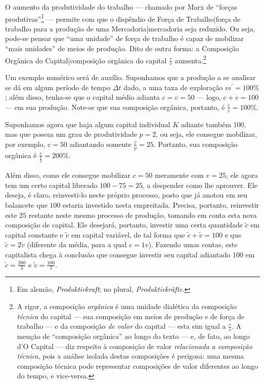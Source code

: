 O aumento da produtividade do trabalho — chamado por Marx de ``forças produtivas''\footnote{Em alemão, \textit{Produktivkraft}; no plural, \textit{Produktivkräfte}.} — permite com que o dispêndio de Força de Trabalho|força de trabalho para a produção de uma Mercadoria|mercadoria seja reduzido. Ou seja, pode-se pensar que ``uma unidade'' de força de trabalho é capaz de mobilizar ``mais unidades'' de meios de produção. Dito de outra forma: a Composição Orgânica do Capital|composição orgânica do capital $\frac{c}{v}$ aumenta.\footnote{A rigor, a composição \textit{orgânica} é uma unidade dialética da composição \textit{técnica} do capital — sua composição em meios de produção e de força de trabalho — e da composição \textit{de valor} do capital — esta sim igual a $\frac{c}{v}$. A menção de ``composição orgânica'' ao longo do texto — e, de fato, ao longo d'O Capital — diz respeito à composição de valor \textit{relacionada a composição técnica}, pois a análise isolada destas composições é perigosa: uma mesma composição técnica pode representar composições de valor diferentes ao longo do tempo, e vice-versa.}

Um exemplo numérico será de auxílio. Suponhamos que a produção a se analisar se dá em algum período de tempo $\Delta t$ dado, a uma taxa de exploração $m^{\prime}=100\%$; além disso, tenha-se que o capital médio adianta $c=v=50$ — logo, $c+v=100$ — em sua produção. Note-se que sua composição orgânica, portanto, é $\frac{c}{v}=100\%$.

Suponhamos agora que haja algum capital individual $K$ adiante também $100$, mas que possua um grau de produtividade $p=2$, ou seja, ele consegue mobilizar, por exemplo, $c=50$ adiantando somente $\frac{v}{p}=25$. Portanto, sua composição orgânica é $\frac{c}{\frac{v}{p}}=200\%$. 

Além disso, como ele consegue mobilizar $c=50$ meramente com $v=25$, ele agora tem um certo capital liberado $100-75=25$, a despender como lhe aprouver. Ele deseja, é claro, reinvesti-lo neste próprio processo, posto que já anotou em seu balancete que $100$ estaria investido nesta empreitada. Precisa, portanto, reinvestir este $25$ restante neste mesmo processo de produção, tomando em conta esta nova composição de capital. Ele desejará, portanto, investir uma certa quantidade $\tilde{c}$ em capital constante e $\tilde{v}$ em capital variável, de tal forma que $\tilde{c}+\tilde{v}=100$ e que $\tilde{c} = 2 \tilde{v}$ (diferente da média, para a qual $c=1v$). Fazendo umas contas, este capitalista chega à conclusão que consegue investir seu capital adiantado $100$ em $\tilde{c}=\frac{200}{3}$ e $\tilde{v}=\frac{100}{3}$.

